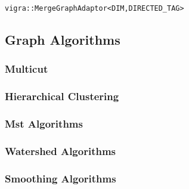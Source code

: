    \lstinline{vigra::MergeGraphAdaptor<DIM,DIRECTED_TAG>}


\subsection{Graph Algorithms} \label{sec:graph_graph_algorithms}

    \subsubsection{Multicut}

    \subsubsection{Hierarchical Clustering}

    \subsubsection{Mst Algorithms}

    \subsubsection{Watershed Algorithms}

    \subsubsection{Smoothing Algorithms}

